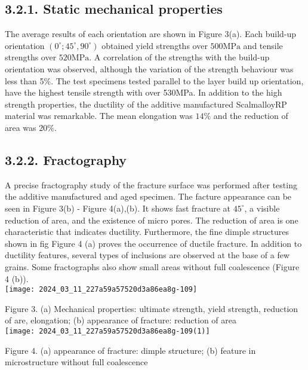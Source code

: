 \documentclass[10pt]{article}
\begin{document}
\subsection*{3.2.1. Static mechanical properties}
The average results of each orientation are shown in Figure 3(a). Each build-up orientation $\left(0^{\circ} ; 45^{\circ}, 90^{\circ}\right)$ obtained yield strengths over $500 \mathrm{MPa}$ and tensile strengths over $520 \mathrm{MPa}$. A correlation of the strengths with the build-up orientation was observed, although the variation of the strength behaviour was less than 5\%. The test specimens tested parallel to the layer build up orientation, have the highest tensile strength with over 530MPa. In addition to the high strength properties, the ductility of the additive manufactured ScalmalloyRP material was remarkable. The mean elongation was $14 \%$ and the reduction of area was $20 \%$.

\subsection*{3.2.2. Fractography}
A precise fractography study of the fracture surface was performed after testing the additive manufactured and aged specimen. The facture appearance can be seen in Figure 3(b) - Figure 4(a),(b). It shows fast fracture at $45^{\circ}$, a visible reduction of area, and the existence of micro pores. The reduction of area is one characteristic that indicates ductility. Furthermore, the fine dimple structures shown in fig Figure 4 (a) proves the occurrence of ductile fracture. In addition to ductility features, several types of inclusions are observed at the base of a few grains. Some fractographs also show small areas without full coalescence (Figure 4 (b)).\\
\texttt{[image: 2024\_03\_11\_227a59a57520d3a86ea8g-109]}

Figure 3. (a) Mechanical properties: ultimate strength, yield strength, reduction of are, elongation; (b) appearance of fracture: reduction of area\\
\texttt{[image: 2024\_03\_11\_227a59a57520d3a86ea8g-109(1)]}

Figure 4. (a) appearance of fracture: dimple structure; (b) feature in microstructure without full coalescence
\end{document}
